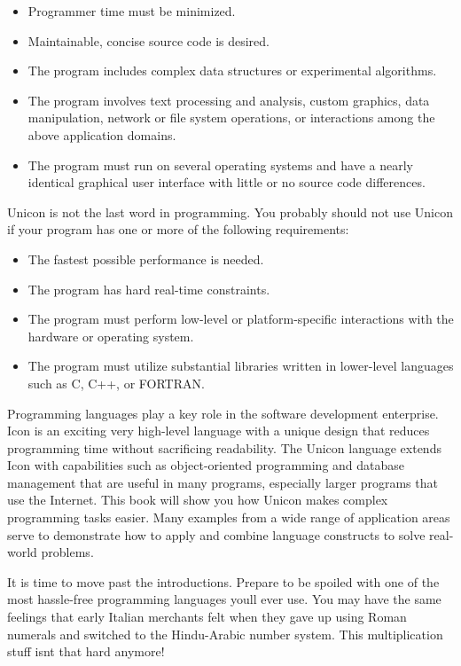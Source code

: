 \begin{itemize}
\item Programmer time must be minimized.
\item Maintainable, concise source code is desired.
\item The program includes complex data structures or experimental
algorithms.
\item The program involves text processing and analysis, custom
graphics, data manipulation, network or file system operations, or
interactions among the above application domains.
\item The program must run on several operating systems and have a
nearly identical graphical user interface with little or no source code
differences.
\end{itemize}
Unicon is not the last word in programming. You probably should not use
Unicon if your program has one or more of the following requirements:

\begin{itemize}
\item The fastest possible performance is needed.
\item The program has hard real-time constraints.
\item The program must perform low-level or platform-specific
interactions with the hardware or operating system.
\item The program must utilize substantial libraries written in
lower-level languages such as C, C++, or FORTRAN.
\end{itemize}
Programming languages play a key role in the software development
enterprise. Icon is an exciting very high-level language with a unique
design that reduces programming time without sacrificing readability.
The Unicon language extends Icon with capabilities such as
object-oriented programming and
database management that are useful in many programs, especially larger
programs that use the Internet. This book will show you how Unicon
makes complex programming tasks easier. Many examples from a wide range
of application areas serve to demonstrate how to apply and combine
language constructs to solve real-world problems.

It is time to move past the introductions. Prepare to be spoiled with
one of the most hassle-free programming languages
you{\textquotesingle}ll ever use. You may have the same feelings that
early Italian merchants felt when they gave up using Roman numerals and
switched to the Hindu-Arabic number system. {\textquotedbl}This
multiplication stuff isn{\textquotesingle}t that hard
anymore!{\textquotedbl} 
